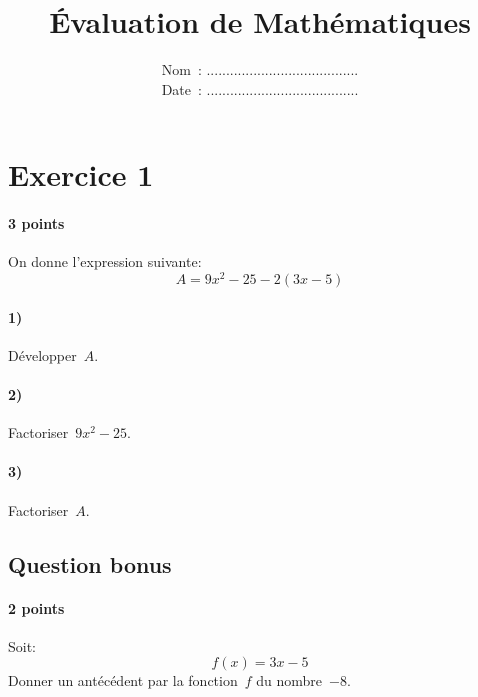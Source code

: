 \documentclass[a4paper]{article}
\begin{document}
  \title{Évaluation de Mathématiques}
  \date{
    Nom~: .......................................\\
    \vspace{0.2cm}
    Date~: .......................................}
  \maketitle

  \section*{Exercice 1}
  \paragraph{3 points}
  On donne l'expression suivante:
  \[
    A = 9 x^2 - 25 - 2(3x - 5)
  \]
  \paragraph{1)} Développer~$A$.
  \paragraph{2)} Factoriser~$9 x^2 - 25$.
  \paragraph{3)} Factoriser~$A$.

  \subsection*{Question bonus}
  \paragraph{2 points}
  Soit:
  \[
    f(x) = 3x - 5
  \]
  Donner un antécédent par la fonction~$f$ du nombre~$-8$.
\end{document}
